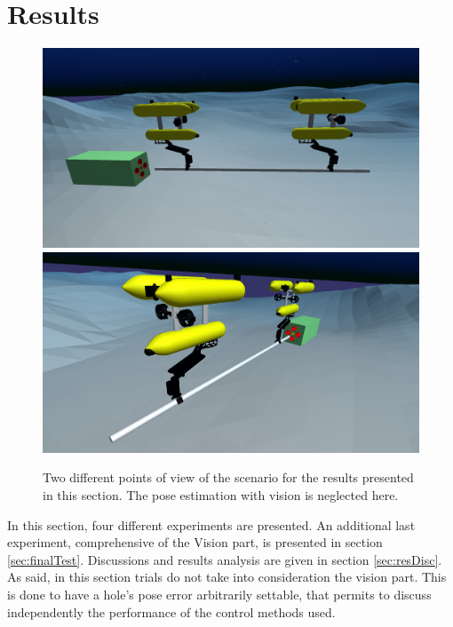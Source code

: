 \section{Results}
\label{sec:resultNoVisio}
\begin{figure}[H]
	\centering
	\includegraphics[width=11.5cm]{scenario_onlyTwin.png}
	\vspace{5px}
	\includegraphics[width=11.5cm]{scenario_onlyTwin2.png}
	
	\caption[Scenario for tests without the vision part]{Two different points of view of the scenario for the results presented in this section. The pose estimation with vision is neglected here.}
	\label{fig:onlyTwin_uwsim}
\end{figure}
In this section, four different experiments are presented. An additional last experiment, comprehensive of the Vision part, is presented in section \ref{sec:finalTest}. Discussions and results analysis are given in section \ref{sec:resDisc}.\\ 

As said, in this section trials do not take into consideration the vision part. This is done to have a hole's pose error arbitrarily settable, that permits to discuss independently the performance of the control methods used.\\

